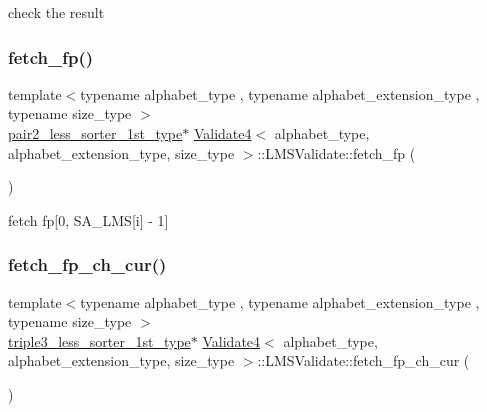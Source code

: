 check the result 

\mbox{\label{struct_validate4_1_1_l_m_s_validate_a0d6e08ffc57dfd088ff737ed01a566b2}} 
\subsubsection{\texorpdfstring{fetch\+\_\+fp()}{fetch\_fp()}}
{\footnotesize\ttfamily template$<$typename alphabet\+\_\+type , typename alphabet\+\_\+extension\+\_\+type , typename size\+\_\+type $>$ \\
\hyperlink{class_validate4_ad945003027abfd152a0e177d7541580d}{pair2\+\_\+less\+\_\+sorter\+\_\+1st\+\_\+type}$\ast$ \hyperlink{class_validate4}{Validate4}$<$ alphabet\+\_\+type, alphabet\+\_\+extension\+\_\+type, size\+\_\+type $>$\+::L\+M\+S\+Validate\+::fetch\+\_\+fp (\begin{DoxyParamCaption}{ }\end{DoxyParamCaption})\hspace{0.3cm}{\ttfamily [inline]}}



fetch fp\mbox{[}0, S\+A\+\_\+\+L\+MS\mbox{[}i\mbox{]} -\/ 1\mbox{]} 

\mbox{\label{struct_validate4_1_1_l_m_s_validate_aa0d10da14dc1a8015967216e19eeb9af}} 
\subsubsection{\texorpdfstring{fetch\+\_\+fp\+\_\+ch\+\_\+cur()}{fetch\_fp\_ch\_cur()}}
{\footnotesize\ttfamily template$<$typename alphabet\+\_\+type , typename alphabet\+\_\+extension\+\_\+type , typename size\+\_\+type $>$ \\
\hyperlink{class_validate4_ac2e4bde5df51eeff18ef5591d76e63dc}{triple3\+\_\+less\+\_\+sorter\+\_\+1st\+\_\+type}$\ast$ \hyperlink{class_validate4}{Validate4}$<$ alphabet\+\_\+type, alphabet\+\_\+extension\+\_\+type, size\+\_\+type $>$\+::L\+M\+S\+Validate\+::fetch\+\_\+fp\+\_\+ch\+\_\+cur (\begin{DoxyParamCaption}{ }\end{DoxyParamCaption})\hspace{0.3cm}{\ttfamily [inline]}}



